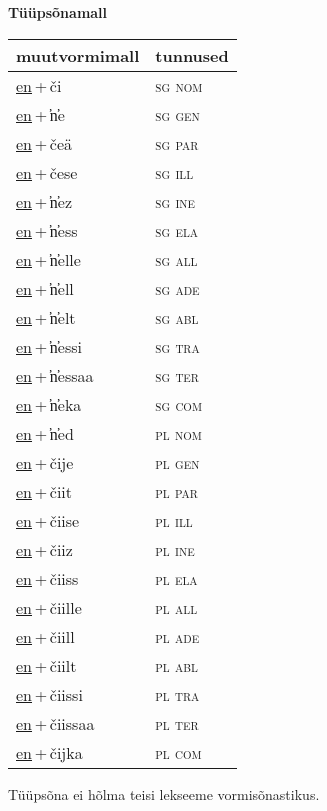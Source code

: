 
\vspace{1.8em}
\begin{minipage}{\textwidth}
\textbf{Tüüpsõnamall \,}\\

\begin{sideways}
\begin{tabular}{l l}
muutvormimall & tunnused \\
\hline
\underline{en}\,+\,či & \textsc{ sg nom } \\
\underline{en}\,+\,̕n̕e & \textsc{ sg gen } \\
\underline{en}\,+\,čeä & \textsc{ sg par } \\
\underline{en}\,+\,čese & \textsc{ sg ill } \\
\underline{en}\,+\,̕n̕ez & \textsc{ sg ine } \\
\underline{en}\,+\,̕n̕ess & \textsc{ sg ela } \\
\underline{en}\,+\,̕n̕elle & \textsc{ sg all } \\
\underline{en}\,+\,̕n̕ell & \textsc{ sg ade } \\
\underline{en}\,+\,̕n̕elt & \textsc{ sg abl } \\
\underline{en}\,+\,̕n̕essi & \textsc{ sg tra } \\
\underline{en}\,+\,̕n̕essaa & \textsc{ sg ter } \\
\underline{en}\,+\,̕n̕eka & \textsc{ sg com } \\
\underline{en}\,+\,̕n̕ed & \textsc{ pl nom } \\
\underline{en}\,+\,čije & \textsc{ pl gen } \\
\underline{en}\,+\,čiit & \textsc{ pl par } \\
\underline{en}\,+\,čiise & \textsc{ pl ill } \\
\underline{en}\,+\,čiiz & \textsc{ pl ine } \\
\underline{en}\,+\,čiiss & \textsc{ pl ela } \\
\underline{en}\,+\,čiille & \textsc{ pl all } \\
\underline{en}\,+\,čiill & \textsc{ pl ade } \\
\underline{en}\,+\,čiilt & \textsc{ pl abl } \\
\underline{en}\,+\,čiissi & \textsc{ pl tra } \\
\underline{en}\,+\,čiissaa & \textsc{ pl ter } \\
\underline{en}\,+\,čijka & \textsc{ pl com } \\
\end{tabular}
\end{sideways}
\label{tab:tüüpsõnamall-enči}

\end{minipage}

 
\vspace{1em}
\noindent Tüüpsõna ei hõlma teisi lekseeme vormi\-sõnastikus.
